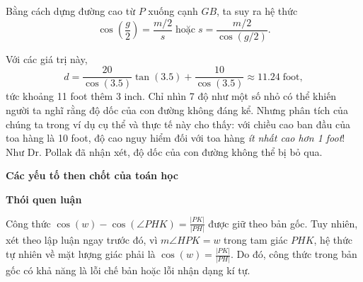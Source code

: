 {    Bằng cách dựng đường cao từ $P$ xuống cạnh $GB$, ta suy ra hệ thức
    $$
      \cos\left(\frac{g}{2}\right)=\frac{m/2}{s} \; \text{hoặc} \; s=\frac{m/2}{\cos(g/2)}.
    $$

    Với các giá trị này,
    $$
      d=\frac{20}{\cos(3.5)}\tan(3.5)+\frac{10}{\cos(3.5)}\approx 11.24 \; \text{foot},
    $$
    tức khoảng 11 foot thêm 3 inch. Chỉ nhìn 7 độ như một số nhỏ có thể khiến người ta nghĩ rằng độ dốc của con đường không đáng kể. Nhưng phân tích của chúng ta trong ví dụ cụ thể và thực tế này cho thấy: với chiều cao ban đầu của toa hàng là 10 foot, độ cao nguy hiểm đối với toa hàng \emph{ít nhất cao hơn 1 foot}! Như Dr. Pollak đã nhận xét, độ dốc của con đường không thể bị bỏ qua.

    \textbf{Các yếu tố then chốt của toán học}

    \begin{hanglist}

      \vspace{\baselineskip}

    \end{hanglist}

    \textbf{Thói quen luận}

    \begin{hanglist}

      \vspace{\baselineskip}


    \end{hanglist}
  }
  {
    Công thức $\cos(w)-\cos(\angle PHK)=\frac{\lvert PK\rvert}{\lvert PH\rvert}$ được giữ theo bản gốc. Tuy nhiên, xét theo lập luận ngay trước đó, vì $m\angle HPK=w$ trong tam giác $PHK$, hệ thức tự nhiên về mặt lượng giác phải là $\cos(w)=\frac{\lvert PK\rvert}{\lvert PH\rvert}$. Do đó, công thức trong bản gốc có khả năng là lỗi chế bản hoặc lỗi nhận dạng kí tự.
  }

